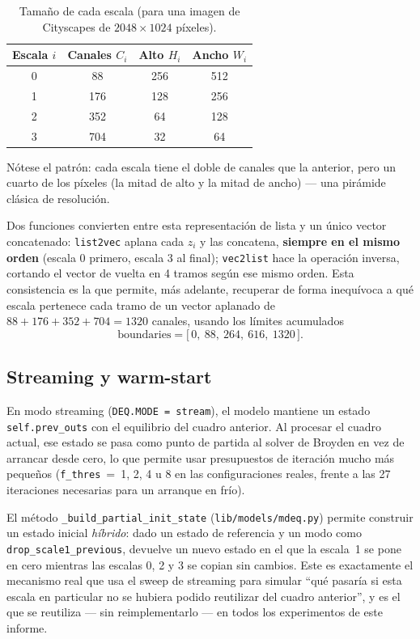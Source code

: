 \documentclass[11pt,a4paper]{article}
\newcommand{\code}[1]{\texttt{#1}}
\begin{document}
\begin{table}[H]
  \centering
  \caption{Tamaño de cada escala (para una imagen de Cityscapes de \(2048\times1024\) píxeles).}
  \label{tab:escalas}
  \begin{tabular}{@{}cccc@{}}
    \toprule
    Escala $i$ & Canales $C_i$ & Alto $H_i$ & Ancho $W_i$ \\
    \midrule
    0 & 88  & 256 & 512 \\
    1 & 176 & 128 & 256 \\
    2 & 352 & 64  & 128 \\
    3 & 704 & 32  & 64  \\
    \bottomrule
  \end{tabular}
\end{table}

Nótese el patrón: cada escala tiene el doble de canales que la anterior, pero un cuarto de los
píxeles (la mitad de alto y la mitad de ancho) --- una pirámide clásica de resolución.

Dos funciones convierten entre esta representación de lista y un único vector concatenado:
\code{list2vec} aplana cada $z_i$ y las concatena, \textbf{siempre en el mismo orden} (escala 0
primero, escala 3 al final); \code{vec2list} hace la operación inversa, cortando el vector de
vuelta en 4 tramos según ese mismo orden. Esta consistencia es la que permite, más adelante,
recuperar de forma inequívoca a qué escala pertenece cada tramo de un vector aplanado de
$88+176+352+704 = 1320$ canales, usando los límites acumulados
\begin{equation}
  \text{boundaries} = \big[\,0,\ 88,\ 264,\ 616,\ 1320\,\big].
  \label{eq:boundaries}
\end{equation}

\subsection{Streaming y warm-start}

En modo streaming (\code{DEQ.MODE = stream}), el modelo mantiene un estado
\code{self.prev\_outs} con el equilibrio del cuadro anterior. Al procesar el cuadro actual, ese
estado se pasa como punto de partida al solver de Broyden en vez de arrancar desde cero, lo que
permite usar presupuestos de iteración mucho más pequeños (\code{f\_thres}~=~1, 2, 4 u 8 en las
configuraciones reales, frente a las 27 iteraciones necesarias para un arranque en frío).

El método \code{\_build\_partial\_init\_state} (\code{lib/models/mdeq.py}) permite construir un
estado inicial \emph{híbrido}: dado un estado de referencia y un modo como
\code{drop\_scale1\_previous}, devuelve un nuevo estado en el que la escala~1 se pone en cero
mientras las escalas 0, 2 y 3 se copian sin cambios. Este es exactamente el mecanismo real que usa
el sweep de streaming para simular ``qué pasaría si esta escala en particular no se hubiera podido
reutilizar del cuadro anterior'', y es el que se reutiliza --- sin reimplementarlo --- en todos los
experimentos de este informe.
\end{document}
